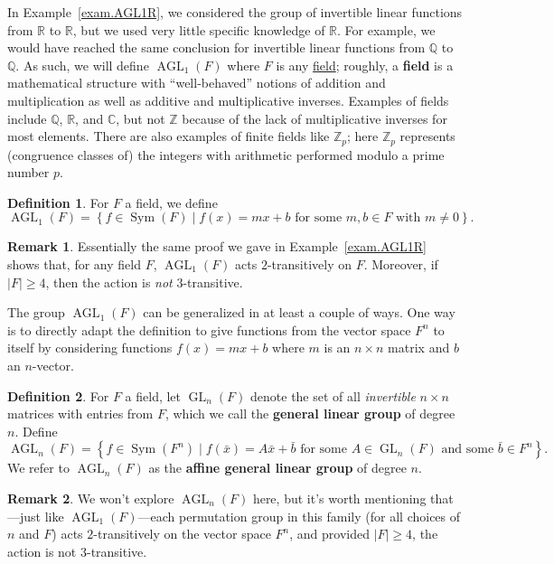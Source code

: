 \documentclass[11pt]{amsart}
\theoremstyle{plain}
\theoremstyle{definition}
\newtheorem*{definition*}{Definition}
\newtheorem*{remark*}{Remark}
\theoremstyle{remark}
\DeclareMathOperator{\Sym}{Sym}
\DeclareMathOperator{\GL}{GL}
\DeclareMathOperator{\AGL}{AGL}
\begin{document}
In Example~\ref{exam.AGL1R}, we considered the group of invertible linear functions from $\mathbb{R}$ to $\mathbb{R}$, but we used very little specific knowledge of $\mathbb{R}$. For example, we would have reached the same conclusion for invertible linear functions from $\mathbb{Q}$ to $\mathbb{Q}$. As such, we will define $\AGL_1(F)$ where $F$ is any \href{https://en.wikipedia.org/wiki/Field_(mathematics)}{field}; roughly, a \textbf{field} is a mathematical structure with ``well-behaved'' notions of addition and multiplication as well as additive and multiplicative inverses. Examples of fields include $\mathbb{Q}$, $\mathbb{R}$, and $\mathbb{C}$, but not $\mathbb{Z}$ because of the lack of multiplicative inverses for most elements. There are also  examples of finite fields like $\mathbb{Z}_p$; here $\mathbb{Z}_p$ represents (congruence classes of) the integers with arithmetic performed modulo a prime number $p$.

\begin{definition*}
For $F$ a field, we define \[\AGL_1(F) = \left\{ f \in \Sym(F) \mid \text{$f(x) = mx+b$ for some $m,b\in F$ with $m\neq 0$}\right\}.\]
\end{definition*}

\begin{remark*}
Essentially the same proof we gave in Example~\ref{exam.AGL1R} shows that, for any field $F$, $\AGL_1(F)$ acts $2$-transitively on $F$. Moreover, if $|F| \ge 4$, then the action is \emph{not} $3$-transitive. 
\end{remark*}

The group $\AGL_1(F)$ can be generalized in at least a couple of ways. One way is to directly adapt the definition to give functions from the vector space $F^n$ to itself by considering functions $f(x) = mx+b$ where $m$ is an $n\times n$ matrix and $b$ an $n$-vector. 

\begin{definition*}
For $F$ a field, let $\GL_{n}(F)$ denote the set of all \emph{invertible} $n\times n$ matrices with entries from $F$, which we call the \textbf{general linear group} of degree $n$. Define
\[\AGL_n(F) = \left\{ f \in \Sym(F^n) \mid \text{$f(\bar{x}) = A\bar{x}+\bar{b}$ for some $A\in \GL_{n}(F)$ and some $\bar{b} \in F^n$}\right\}.\]
We refer to $\AGL_n(F)$ as the \textbf{affine general linear group} of degree $n$.
\end{definition*}

\begin{remark*}
We won't explore $\AGL_n(F)$  here, but it's worth mentioning that---just like $\AGL_1(F)$---each permutation group in this family (for all choices of $n$ and $F$) acts  $2$-transitively on the vector space $F^n$, and provided $|F| \ge 4$, the action is not $3$-transitive.
\end{remark*}
\end{document}
